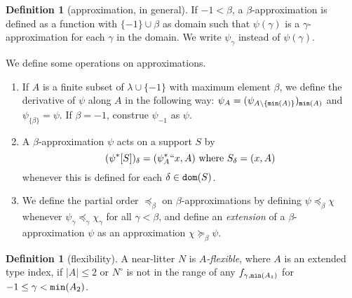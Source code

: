 \documentclass[112pt]{article}
\theoremstyle{definition}
\newtheorem{definition}[theorem]{Definition}
\theoremstyle{remark}
\newcommand{\suggest}[1]{{\color{red} #1}}
\newcommand{\hsuggest}[1]{{\color{magenta}#1}}
\begin{document}
\begin{definition}[approximation, in general]\label{def:approx}
  If $-1 < \beta$, a $\beta$-approximation is defined as a function with $\{-1\} \cup \beta$ as domain such that $\psi(\gamma)$ is a $\gamma$-approximation for each $\gamma$ in the domain.  We write $\psi_\gamma$ instead of $\psi(\gamma)$.

  We define some operations on approximations.
  \begin{enumerate}
    \item If $A$ is a finite subset of $\lambda\cup \{-1\}$ with maximum element $\beta$, we define the derivative of $\psi$ along $A$ in the following way: $\psi_A = (\psi_{A \setminus \{{\tt min}(A)\}})_{{\tt min}(A)}$ and %
$\psi_{\{\beta\}} = \psi$.
  If $\beta=-1$, construe $\psi_{-1}$ as $\psi$.

    \item A $\beta$-approximation $\psi$ acts on a support $S$ by
    $$ (\psi^*[S])_\delta = (\psi_A ^*`` x, A) \ \mathrm{where}\ S_\delta = (x, A) $$
    whenever this is defined for each $\delta \in {\tt dom}(S)$.
    \item We define the partial order $\preceq_\beta$ on $\beta$-approximations by defining $\psi \preceq_\beta \chi$ whenever $\psi_\gamma \preceq_\gamma \chi_\gamma$ for all $\gamma < \beta$, and define an {\em extension\/} of a $\beta$-approximation $\psi$ as an approximation $\chi \succeq_\beta \psi$.

  \end{enumerate}
\end{definition}
\begin{definition}[flexibility]\label{def:flexible}
  A near-litter $N$ is {\em  $A$-flexible\/}, where $A$ is an extended type index,  if $|A| \leq 2$ or $N^\circ$ is not in the range of any $f_{\gamma,{\tt min}(A_1)}$
for $-1 \leq \gamma<{\tt min}(A_2)$.  
\end{definition}
\end{document}
